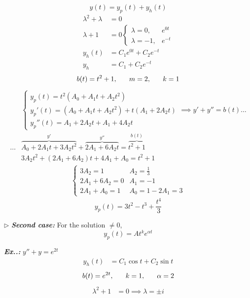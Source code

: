 \documentclass[a4paper]{article}
\begin{document}
$$
y(t)=y_{p}(t)+y_{h}(t)
$$
\begin{align}
\lambda^{2}+\lambda&=0 \\
\lambda+1&=0\begin{cases}
\lambda=0,&e^{ 0t } \\
\lambda=-1,&e^{ -t }
\end{cases} \\
y_{h}(t)&=C_{1}e^{ 0t }+C_{2}e^{ -t } \\
y_{h}&=C_{1}+C_{2}e^{ -t }
\end{align}
$$
b(t)=t^{2}+1,\hspace{4ex}m=2,\hspace{4ex}k=1
$$
\begin{align}
&\begin{cases}
y_{p}(t)=t^{2}(A_{0}+A_{1}t+A_{2}t^{2}) \\
y_{p}'(t)=(A_{0}+A_{1}t+A_{2}t^{2})+t(A_{1}+2A_{2}t)\\
y_{p}''(t)=A_{1}+2A_{2}t+A_{1}+4A_{2}t
\end{cases}\implies y'+y''=b(t)\dots \\
\dots& \overbrace{A_{0}+2A_{1}t+3A_{2}t^{2}}^{y'}+\overbrace{2A_{1}+6A_{2}t}^{y''}=\overbrace{t^{2}+1}^{b(t)} \\
&3A_{2}t^{2}+(2A_{1}+6A_{2})t+4A_{1}+A_{0}=t^{2}+1
\end{align}
\begin{align}
\begin{cases}
3A_{2}=1&A_{2}=\frac{1}{3} \\
2A_{1}+6A_{2}=0 & A_{1}=-1 \\
2A_{1}+A_{0}=1 & A_{0}=1-2A_{1}=3
\end{cases}
\end{align}
$$
\boxed{y_{p}(t)=3t^{2}-t^{3}+\frac{t^{4}}{3}}
$$

$\triangleright$ \textbf{\textit{Second case:}} For the solution $\neq 0$,
$$
y_{p}(t)=At^{k}e^{ \alpha t }
$$

\vspace{2ex}\textbf{\textit{Ex.\thesection.\theex: }}$y''+y=e^{ 2t }$
\begin{align}
y_{h}(t)&=C_{1}\cos t+C_{2}\sin t
\end{align}
$$
b(t)=e^{ 2t },\hspace{4ex}k=1,\hspace{4ex}\alpha=2
$$
\begin{align}
\lambda^{2}+1&=0\implies \lambda=\pm i
\end{align}
\end{document}
